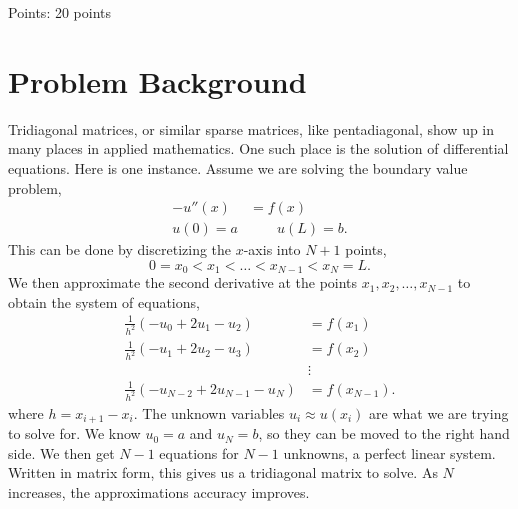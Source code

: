 \documentclass{article}
\newcommand\probnametwo{}
\begin{document}
\begin{multicols}{1}




\begin{minipage}{\textwidth}
	 \begin{center} \shadowbox{\begin{Bcenter}  \Huge \textbf{Other Final Ideas} \\ \Huge \textbf{\probnametwo}  \end{Bcenter}  }
	 
	 {\Large 
	 
	 Points: 20 points}
	  \end{center}
 \end{minipage}

\columnbreak


%	
%	
\end{multicols}






\section*{Problem Background}
	 Tridiagonal matrices, or similar sparse matrices, like pentadiagonal, show up in many places in applied mathematics.  One such place is the solution of differential equations.  Here is one instance.  Assume we are solving the boundary value problem,
	 \begin{align*}
	 	-u''(x) &= f(x) \\
	 	u(0) = a &\qquad u(L) = b.	
	 \end{align*}
	 This can be done by discretizing the $x$-axis into $N+1$ points,
	 \[ 0 = x_0 < x_1 < \ldots < x_{N-1} < x_N = L.\]
	 We then approximate the second derivative at the points $x_1, x_2, \ldots, x_{N-1}$ to obtain the system of equations,
	 \begin{align*}
	 	\frac{1}{h^2}(-u_0 + 2u_1 - u_2) &= f(x_1) \\	
	 	\frac{1}{h^2}(-u_1 + 2u_2 - u_3) &= f(x_2) \\
	 	&\vdots \\
	 	\frac{1}{h^2}(-u_{N-2} + 2u_{N-1} - u_N) &= f(x_{N-1}).
	 \end{align*}
	 where $h = x_{i+1} - x_i$.  The unknown variables $u_i \approx u(x_i)$ are what we are trying to solve for.  We know $u_0=a$ and $u_N=b$, so they can be moved to the right hand side.  We then get $N-1$ equations for $N-1$ unknowns, a perfect linear system.  Written in matrix form, this gives us a tridiagonal matrix to solve.  As $N$ increases, the approximations accuracy improves.
	 
\end{document}
